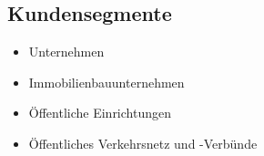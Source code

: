 \subsection{Kundensegmente}

\begin{itemize}
  \item Unternehmen
  \item Immobilienbauunternehmen
  \item Öffentliche Einrichtungen
  \item Öffentliches Verkehrsnetz und -Verbünde
\end{itemize}